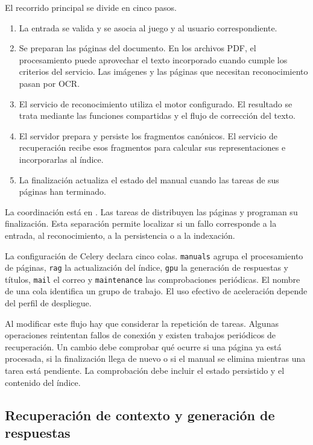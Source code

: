 El recorrido principal se divide en cinco pasos.

\begin{enumerate}
  \item La entrada se valida y se asocia al juego y al usuario correspondiente.
  \item Se preparan las páginas del documento. En los archivos \ac{PDF}, el procesamiento puede aprovechar el texto incorporado cuando cumple los criterios del servicio. Las imágenes y las páginas que necesitan reconocimiento pasan por \ac{OCR}.
  \item El servicio de reconocimiento utiliza el motor configurado. El resultado se trata mediante las funciones compartidas y el flujo de corrección del texto.
  \item El servidor prepara y persiste los fragmentos canónicos. El servicio de recuperación recibe esos fragmentos para calcular sus representaciones e incorporarlas al índice.
  \item La finalización actualiza el estado del manual cuando las tareas de sus páginas han terminado.
\end{enumerate}

La coordinación está en . Las tareas de  distribuyen las páginas y programan su finalización. Esta separación permite localizar si un fallo corresponde a la entrada, al reconocimiento, a la persistencia o a la indexación.

La configuración de Celery declara cinco colas. \texttt{manuals} agrupa el procesamiento de páginas, \texttt{rag} la actualización del índice, \texttt{gpu} la generación de respuestas y títulos, \texttt{mail} el correo y \texttt{maintenance} las comprobaciones periódicas. El nombre de una cola identifica un grupo de trabajo. El uso efectivo de aceleración depende del perfil de despliegue.

Al modificar este flujo hay que considerar la repetición de tareas. Algunas operaciones reintentan fallos de conexión y existen trabajos periódicos de recuperación. Un cambio debe comprobar qué ocurre si una página ya está procesada, si la finalización llega de nuevo o si el manual se elimina mientras una tarea está pendiente. La comprobación debe incluir el estado persistido y el contenido del índice.

\subsection{Recuperación de contexto y generación de respuestas}

